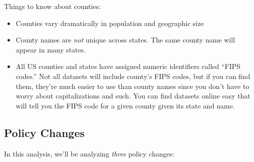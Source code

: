 \documentclass[12pt]{article}
\begin{document}
Things to know about counties:

\begin{itemize}
  \item Counties vary dramatically in population and geographic size
  \item County names are \emph{not} unique across states. The same county name will appear in many states.
  \item All US counties and states have assigned numeric identifiers called ``FIPS codes.'' Not all datasets will include county's FIPS codes, but if you can find them, they're much easier to use than county names since you don't have to worry about capitalizations and such. You can find datasets online easy that will tell you the FIPS code for a given county given its state and name.
\end{itemize}

\subsection*{Policy Changes}

In this analysis, we'll be analyzing \emph{three} policy changes:
\end{document}
